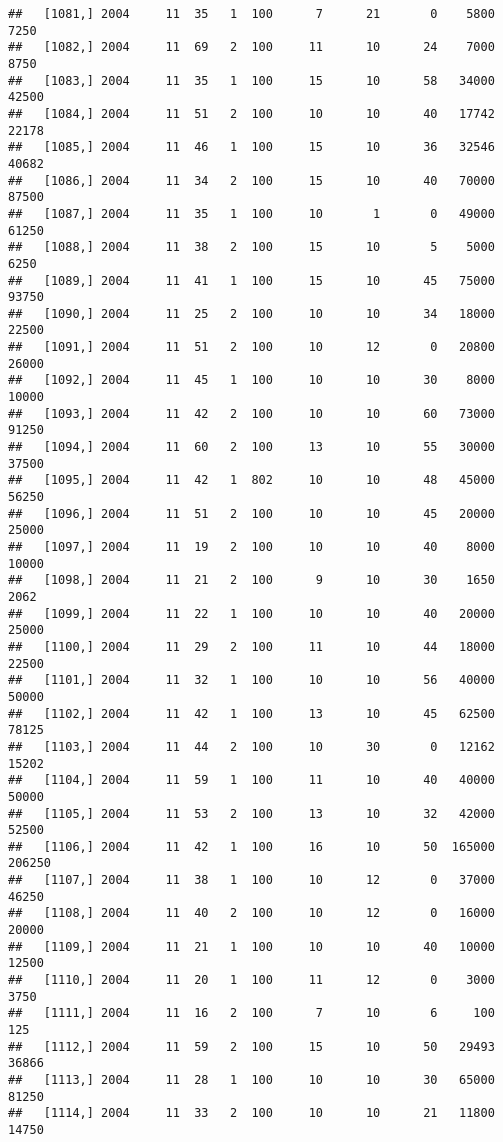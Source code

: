 \documentclass{article}\usepackage[]{graphicx}\usepackage[]{color}
\makeatletter
\newenvironment{kframe}{%
 \def\at@end@of@kframe{}%
 \ifinner\ifhmode%
  \def\at@end@of@kframe{\end{minipage}}%
  \begin{minipage}{\columnwidth}%
 \fi\fi%
 \def\FrameCommand##1{\hskip\@totalleftmargin \hskip-\fboxsep
 \colorbox{shadecolor}{##1}\hskip-\fboxsep
     \hskip-\linewidth \hskip-\@totalleftmargin \hskip\columnwidth}%
 \MakeFramed {\advance\hsize-\width
   \@totalleftmargin\z@ \linewidth\hsize
   \@setminipage}}%
 {\par\unskip\endMakeFramed%
 \at@end@of@kframe}
\newenvironment{knitrout}{}{} %
\makeatother
\begin{document}
\begin{knitrout}
\begin{kframe}
\begin{verbatim}
##   [1081,] 2004     11  35   1  100      7      21       0    5800    7250
##   [1082,] 2004     11  69   2  100     11      10      24    7000    8750
##   [1083,] 2004     11  35   1  100     15      10      58   34000   42500
##   [1084,] 2004     11  51   2  100     10      10      40   17742   22178
##   [1085,] 2004     11  46   1  100     15      10      36   32546   40682
##   [1086,] 2004     11  34   2  100     15      10      40   70000   87500
##   [1087,] 2004     11  35   1  100     10       1       0   49000   61250
##   [1088,] 2004     11  38   2  100     15      10       5    5000    6250
##   [1089,] 2004     11  41   1  100     15      10      45   75000   93750
##   [1090,] 2004     11  25   2  100     10      10      34   18000   22500
##   [1091,] 2004     11  51   2  100     10      12       0   20800   26000
##   [1092,] 2004     11  45   1  100     10      10      30    8000   10000
##   [1093,] 2004     11  42   2  100     10      10      60   73000   91250
##   [1094,] 2004     11  60   2  100     13      10      55   30000   37500
##   [1095,] 2004     11  42   1  802     10      10      48   45000   56250
##   [1096,] 2004     11  51   2  100     10      10      45   20000   25000
##   [1097,] 2004     11  19   2  100     10      10      40    8000   10000
##   [1098,] 2004     11  21   2  100      9      10      30    1650    2062
##   [1099,] 2004     11  22   1  100     10      10      40   20000   25000
##   [1100,] 2004     11  29   2  100     11      10      44   18000   22500
##   [1101,] 2004     11  32   1  100     10      10      56   40000   50000
##   [1102,] 2004     11  42   1  100     13      10      45   62500   78125
##   [1103,] 2004     11  44   2  100     10      30       0   12162   15202
##   [1104,] 2004     11  59   1  100     11      10      40   40000   50000
##   [1105,] 2004     11  53   2  100     13      10      32   42000   52500
##   [1106,] 2004     11  42   1  100     16      10      50  165000  206250
##   [1107,] 2004     11  38   1  100     10      12       0   37000   46250
##   [1108,] 2004     11  40   2  100     10      12       0   16000   20000
##   [1109,] 2004     11  21   1  100     10      10      40   10000   12500
##   [1110,] 2004     11  20   1  100     11      12       0    3000    3750
##   [1111,] 2004     11  16   2  100      7      10       6     100     125
##   [1112,] 2004     11  59   2  100     15      10      50   29493   36866
##   [1113,] 2004     11  28   1  100     10      10      30   65000   81250
##   [1114,] 2004     11  33   2  100     10      10      21   11800   14750

\end{verbatim}
\end{kframe}
\end{knitrout}
\end{document}
